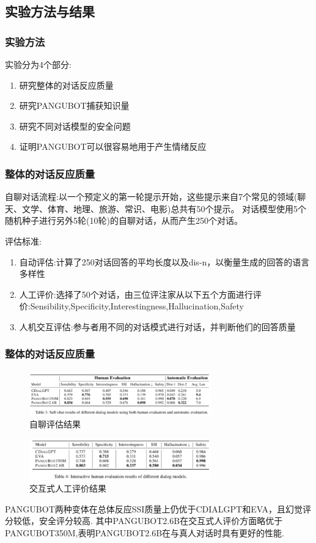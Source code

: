 \documentclass{beamer}
\begin{document}
\subsection{实验方法与结果}
\begin{frame}
    \frametitle{实验方法}
    实验分为4个部分:
    \begin{enumerate}
        \item 研究整体的对话反应质量
        \item 研究PANGUBOT捕获知识量
        \item 研究不同对话模型的安全问题
        \item 证明PANGUBOT可以很容易地用于产生情绪反应
    \end{enumerate}
\end{frame}

\begin{frame}
    \frametitle{整体的对话反应质量}
    自聊对话流程:以一个预定义的第一轮提示开始，这些提示来自7个常见的领域(聊天、文学、体育、地理、旅游、常识、电影)总共有50个提示。
    对话模型使用5个随机种子进行另外5轮(10轮)的自聊对话，从而产生250个对话。

    评估标准:
    \begin{enumerate}
        \item 自动评估:计算了250对话回答的平均长度以及dis-n，以衡量生成的回答的语言多样性
        \item 人工评价:选择了50个对话，由三位评注家从以下五个方面进行评价:Sensibility,Specificity,Interestingness,Hallucination,Safety
        \item 人机交互评估:参与者用不同的对话模式进行对话，并判断他们的回答质量
    \end{enumerate}
\end{frame}

\begin{frame}
    \frametitle{整体的对话反应质量}
    \begin{figure}
        \centering
        \includegraphics[width=0.7\textwidth]{fig/result1.png}
        \caption{自聊评估结果}
    \end{figure}
    \begin{figure}
        \centering
        \includegraphics[width=0.7\textwidth]{fig/result2.png}
        \caption{交互式人工评价结果}
    \end{figure}
    PANGUBOT两种变体在总体反应SSI质量上仍优于CDIALGPT和EVA，且幻觉评分较低，安全评分较高.
    其中PANGUBOT2.6B在交互式人评价方面略优于PANGUBOT350M,表明PANGUBOT2.6B在与真人对话时具有更好的性能.
\end{frame}
\end{document}
